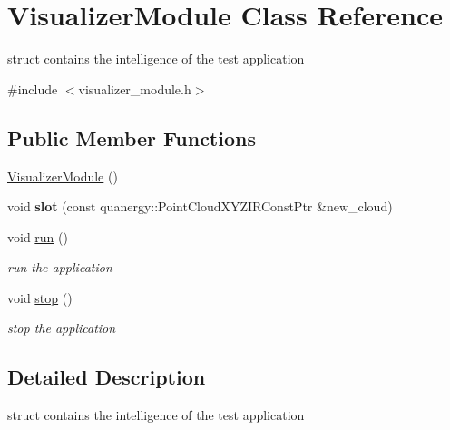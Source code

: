 \hypertarget{classVisualizerModule}{\section{Visualizer\-Module Class Reference}
\label{classVisualizerModule}
}


struct contains the intelligence of the test application  




{\ttfamily \#include $<$visualizer\-\_\-module.\-h$>$}

\subsection*{Public Member Functions}
\begin{DoxyCompactItemize}
\item 
\hyperlink{classVisualizerModule_a133805b5b07aaedc10eb9315cb6d3f5f}{Visualizer\-Module} ()
\item 
\hypertarget{classVisualizerModule_aa61d4ab50f76c2c1f9cceb6389db2db2}{void {\bfseries slot} (const quanergy\-::\-Point\-Cloud\-X\-Y\-Z\-I\-R\-Const\-Ptr \&new\-\_\-cloud)}\label{classVisualizerModule_aa61d4ab50f76c2c1f9cceb6389db2db2}

\item 
void \hyperlink{classVisualizerModule_a386e56c93e95ce3381dd99691ce53a0b}{run} ()
\begin{DoxyCompactList}\small\item\em run the application \end{DoxyCompactList}\item 
\hypertarget{classVisualizerModule_acd1bbd20ca2637ffd30e5e5693831193}{void \hyperlink{classVisualizerModule_acd1bbd20ca2637ffd30e5e5693831193}{stop} ()}\label{classVisualizerModule_acd1bbd20ca2637ffd30e5e5693831193}

\begin{DoxyCompactList}\small\item\em stop the application \end{DoxyCompactList}\end{DoxyCompactItemize}


\subsection{Detailed Description}
struct contains the intelligence of the test application 

